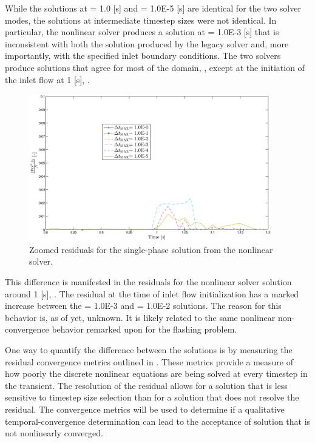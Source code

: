 While the solutions at \dtmax{} = 1.0 [s] and \dtmax{} = 1.0E-5 [s] are identical for the two solver modes, the solutions at intermediate timestep sizes were not identical.
In particular, the nonlinear solver produces a solution at \dtmax{} = 1.0E-3 [s] that is inconsistent with both the solution produced by the legacy solver and, more importantly, with the specified inlet boundary conditions.
The two solvers produce solutions that agree for most of the domain, , except at the initiation of the inlet flow at 1 [s], .


\begin{figure}[h!t]
\centering
\includegraphics[width=0.94\textwidth]{images/nl_res_single_zoom.eps}
\caption{Zoomed residuals for the single-phase solution from the nonlinear solver.}
\label{fig:nl_res_single_zoom}
\end{figure}

This difference is manifested in the residuals for the nonlinear solver solution around 1 [s], .
The residual at the time of inlet flow initialization has a marked increase between the \dtmax{} = 1.0E-3 and \dtmax{} = 1.0E-2 solutions.
The reason for this behavior is, as of yet, unknown.
It is likely related to the same nonlinear non-convergence behavior remarked upon for the flashing problem. 

One way to quantify the difference between the solutions is by measuring the residual convergence metrics outlined in .
These metrics provide a measure of how poorly the discrete nonlinear equations are being solved at every timestep in the transient.
The resolution of the residual allows for a solution that is less sensitive to timestep size selection than for a solution that does not resolve the residual.
The convergence metrics will be used to determine if a qualitative temporal-convergence determination can lead to the acceptance of solution that is not nonlinearly converged.

